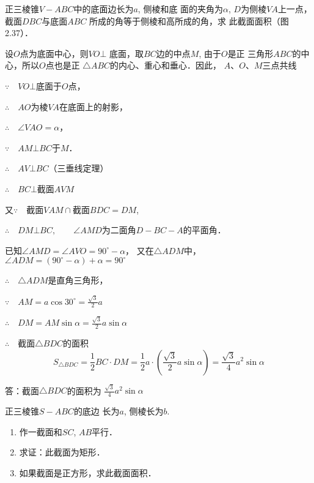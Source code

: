 \begin{example}
    正三棱锥$V-ABC$中的底面边长为$a$, 侧棱和底
面的夹角为$\alpha$, $D$为侧棱$VA$上一点，截面$DBC$与底面$ABC$
所成的角等于侧棱和高所成的角，求
此截面面积（图2.37）．
\end{example}


\begin{solution}
    设$O$点为底面中心，则$VO\bot$
底面，取$BC$边的中点$M$, 由于$O$是正
三角形$ABC$的中心，所以$O$点也是正
$\triangle ABC$的内心、重心和垂心．因此，
$A$、$O$、$M$三点共线

$\because\quad VO\bot$底面于$O$点，

$\therefore\quad AO$为棱$VA$在底面上的射影，

$\therefore\quad \angle VAO=\alpha$，

$\because\quad AM\bot BC$于$M$．

$\therefore\quad AV\bot BC$\qquad （三垂线定理）

$\therefore\quad BC\bot$截面$AVM$

又$\because\quad $截面$VAM\cap$截面$BDC=DM$, 

$\therefore\quad DM\bot BC,\qquad \angle AMD$为二面角$D-BC-A$的平面角．

已知$\angle AMD=\angle AVO=90^{\circ}-\alpha$，
又在$\triangle ADM$中，$\angle ADM=(90^{\circ}-\alpha)+\alpha=90^{\circ}$

$\therefore\quad \triangle ADM$是直角三角形，

$\because\quad AM=a\cos 30^{\circ}=\frac{\sqrt{3}}{2}a$

$\therefore\quad DM=AM\sin\alpha=\frac{\sqrt{3}}{2}a\sin\alpha$

$\therefore\quad $截面$\triangle BDC$的面积
\[S_{\triangle BDC}=\frac{1}{2}BC\cdot DM=\frac{1}{2}a\cdot \left(\frac{\sqrt{3}}{2}a\sin\alpha\right)=\frac{\sqrt{3}}{4}a^2\sin\alpha\]

答：截面$\triangle BDC$的面积为
$\frac{\sqrt{3}}{4}a^2\sin\alpha$
\end{solution}

\begin{example}
    正三棱锥$S-ABC$的底边
    长为$a$, 侧棱长为$b$. 
    
\begin{enumerate}
\item 作一截面和$SC$, $AB$平行．
    \item 求证：此截面为矩形．
    \item 如果截面是正方形，求此截面面积．
\end{enumerate}
\end{example}


